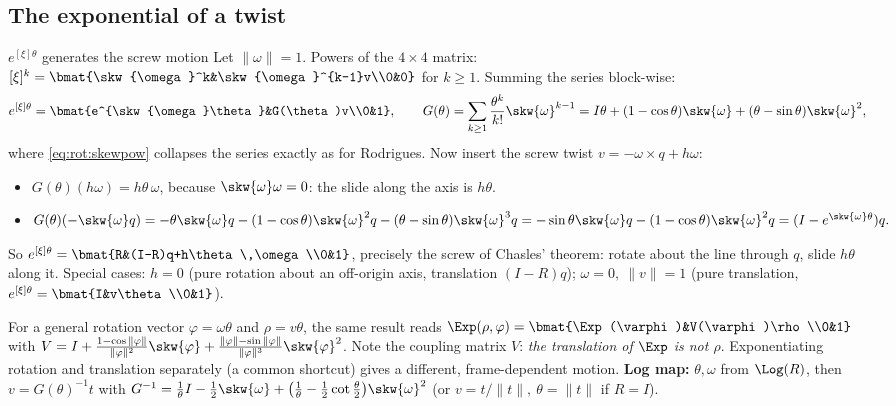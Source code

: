 \subsection{The exponential of a twist}\label{sec:rot:exponential-twist}
\begin{deriv}{$e^{[\xi]\theta}$ generates the screw motion}
Let $\|\omega\|=1$. Powers of the $4\times4$ matrix: $[\xi]^k=\bmat{\skw{\omega}^k&\skw{\omega}^{k-1}v\\0&0}$ for $k\ge1$. Summing the series block-wise:
\[
e^{[\xi]\theta}=\bmat{e^{\skw{\omega}\theta}&G(\theta)v\\0&1},\qquad
G(\theta)=\sum_{k\ge1}\frac{\theta^k}{k!}\skw{\omega}^{k-1}=I\theta+(1-\cos\theta)\skw{\omega}+(\theta-\sin\theta)\skw{\omega}^2,
\]
where \eqref{eq:rot:skewpow} collapses the series exactly as for Rodrigues. Now insert the screw twist $v=-\omega\times q+h\omega$:
\begin{itemize}
\item $G(\theta)(h\omega)=h\theta\,\omega$, because $\skw{\omega}\omega=0$: the slide along the axis is $h\theta$.
\item $G(\theta)(-\skw{\omega}q)=-\theta\skw{\omega}q-(1-\cos\theta)\skw{\omega}^2q-(\theta-\sin\theta)\skw{\omega}^3q=-\sin\theta\skw{\omega}q-(1-\cos\theta)\skw{\omega}^2q=(I-e^{\skw{\omega}\theta})q.$
\end{itemize}
So $e^{[\xi]\theta}=\bmat{R&(I-R)q+h\theta\,\omega\\0&1}$, precisely the screw of Chasles' theorem: rotate about the line through $q$, slide $h\theta$ along it. Special cases: $h=0$ (pure rotation about an off-origin axis, translation $(I-R)q$); $\omega=0,\ \|v\|=1$ (pure translation, $e^{[\xi]\theta}=\bmat{I&v\theta\\0&1}$).
\end{deriv}

For a general rotation vector $\varphi=\omega\theta$ and $\rho=v\theta$, the same result reads $\Exp(\rho,\varphi)=\bmat{\Exp(\varphi)&V(\varphi)\rho\\0&1}$ with $V=I+\frac{1-\cos\|\varphi\|}{\|\varphi\|^2}\skw{\varphi}+\frac{\|\varphi\|-\sin\|\varphi\|}{\|\varphi\|^3}\skw{\varphi}^2$. Note the coupling matrix $V$: \emph{the translation of $\Exp$ is not $\rho$}. Exponentiating rotation and translation separately (a common shortcut) gives a different, frame-dependent motion. \textbf{Log map:} $\theta,\omega$ from $\Log(R)$, then $v=G(\theta)^{-1}t$ with
$G^{-1}=\frac1\theta I-\frac12\skw{\omega}+\big(\frac1\theta-\frac12\cot\frac\theta2\big)\skw{\omega}^2$ (or $v=t/\|t\|,\ \theta=\|t\|$ if $R=I$).


